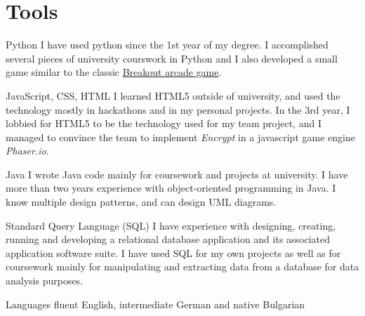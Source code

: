\documentclass{tccv}
\begin{document}
\section{\LARGE Tools \normalsize}

\begin{skillist}

\item{Python} {I have used python since the 1st year of my degree. I accomplished several pieces of university courswork in Python and I also developed a small game similar to the classic \href{http://en.wikipedia.org/wiki/Breakout_(video_game)}{Breakout arcade game}.}

\item{JavaScript, CSS, HTML} {I learned HTML5 outside of university, and used the technology mostly in hackathons and in my personal projects. In the 3rd year, I lobbied for HTML5 to be the technology used for my team project, and I managed to convince the team to implement \textit{Encrypt} in a javascript game engine \textit{Phaser.io}.}

\item{Java}
{I wrote Java code mainly for coursework and projects at university. I have more than two years experience with object-oriented programming in Java. I know multiple design patterns, and can design UML diagrams.}

\item{Standard Query Language (SQL)} %
 {I have experience with designing, creating, running and developing a relational database application and its associated application software suite. I have used SQL for my own projects as well as for coursework mainly for manipulating and extracting data from a database for data analysis purposes.}
\item {Languages } {fluent English, intermediate German and native Bulgarian}
\end{skillist}
\end{document}
